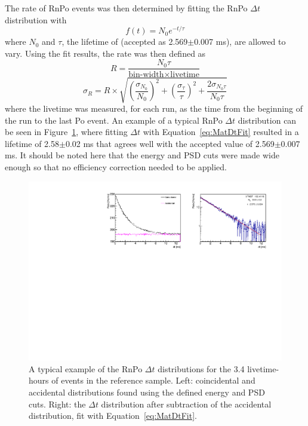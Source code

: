 The rate of RnPo events was then determined by fitting the RnPo $\Delta t$ distribution with
\begin{equation}
	f(t) = N_0e^{-t/\tau}
	\label{eq:MatDtFit}
\end{equation}
where $N_0$ and $\tau$, the lifetime of \Po (accepted as 2.569$\pm$0.007 ms), are allowed to vary. 
Using the fit results, the rate was then defined as
\begin{equation}
	R = \frac{N_0 \tau}{\textrm{bin-width}\times\textrm{livetime}}
\end{equation}
\begin{equation}
	\sigma_R = R \times \sqrt{  \left(\frac{\sigma_{N_0}}{N_0}\right)^2 + \left(\frac{\sigma_{\tau}}{\tau}\right)^2 + \frac{2\sigma_{N_{0}\tau}}{N_0\tau} }
\end{equation}
where the livetime was measured, for each run, as the time from the beginning of the run to the last Po event. 
An example of a typical RnPo $\Delta t$ distribution can be seen in Figure~\ref{fig:rnpodttimebin23s2}, where fitting $\Delta t$ with Equation~\ref{eq:MatDtFit} resulted in a \Po lifetime of 2.58$\pm$0.02 ms that agrees well with the accepted value of 2.569$\pm$0.007 ms. It should be noted here that the energy and PSD cuts were made wide enough so that no efficiency correction needed to be applied.

\begin{figure}[H]
	\centering
	\includegraphics[width=1.\linewidth]{"tex/6-ac227-images/BNL/RnPoDt_TimeBin23_S2"}
	\caption[Typical RnPo $\Delta t$ distribution]{A typical example of the RnPo $\Delta t$ distributions for the 3.4 livetime-hours of events in the reference sample. Left: coincidental and accidental distributions found using the defined energy and PSD cuts. Right: the $\Delta t$ distribution after subtraction of the accidental distribution, fit with Equation~\ref{eq:MatDtFit}.}
	\label{fig:rnpodttimebin23s2}
\end{figure}

